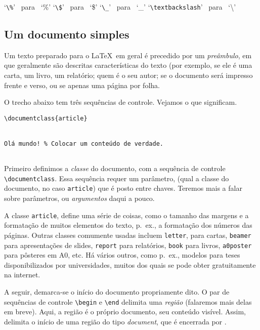 \begin{center}
  `\verb|\%|' \ para \ `\%'%
  \qquad`\verb|\$|' \ para  \ `\$'%
  \qquad`\verb|\_|\negthinspace' \ para \ `\_'%
  \qquad`\verb|\textbackslash|' \ para \ `\textbackslash'\qquad
\end{center}

\subsection{Um documento simples}

Um texto preparado para o \LaTeX\ em geral é precedido por um
\emph{preâmbulo}, em que geralmente são descritas características do
texto (por exemplo, se ele é uma carta, um livro, um relatório; quem é
o seu autor; se o documento será impresso frente e verso, ou se apenas
uma página por folha.

O trecho abaixo tem três sequências de controle. Vejamos o que
significam. 

\begin{footnotesize}
\begin{verbatim}
\documentclass{article}


Olá mundo! % Colocar um conteúdo de verdade.


\end{verbatim}
\end{footnotesize}

Primeiro definimos a \emph{classe} do documento, com a
sequência de controle \verb|\documentclass|. Essa sequência requer um
parâmetro, (qual a classe do documento, no caso \verb!article!) que é
posto entre chaves. Teremos mais a falar sobre parâmetros, ou
\emph{argumentos} daqui a pouco.

A classe \verb!article!, define uma série
de coisas, como o tamanho das margens e a formatação de muitos
elementos do texto, p.~ex., a formatação dos números das páginas. Outras
classes comumente usadas incluem \verb!letter!, para cartas,
\verb!beamer! para apresentações de slides, \verb!report! para
relatórios, \verb!book! para livros, \verb!a0poster! para pôsteres em
A0, etc. Há vários outros, como p.~ex., modelos para teses
disponibilizados por universidades, muitos dos quais se pode obter
gratuitamente na internet.

A seguir, demarca-se o início do documento propriamente dito. O par de
sequências de controle \verb!\begin! e \verb!\end! delimita uma
\emph{região} (falaremos mais delas em breve). Aqui, a região é o
próprio documento, seu conteúdo visível. Assim,
\verb!! delimita o início de uma região do tipo
\emph{document}, que é encerrada por \verb!!.

